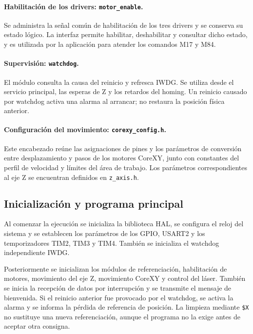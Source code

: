 \documentclass[blue,fullpaper]{ludusofficial}  %
\begin{document}
\paragraph{Habilitación de los drivers:
\texttt{motor\_enable}.}
Se administra la señal común de habilitación de los
tres drivers y se conserva su estado lógico. La interfaz
permite habilitar, deshabilitar y consultar dicho estado,
y es utilizada por la aplicación para atender los
comandos M17 y M84.

\paragraph{Supervisión: \texttt{watchdog}.}
El módulo consulta la causa del reinicio y refresca IWDG. Se utiliza desde el servicio principal, las esperas de Z y los retardos del homing. Un reinicio causado por watchdog activa una alarma al arrancar; no restaura la posición física anterior.

\paragraph{Configuración del movimiento:
\texttt{corexy\_config.h}.}
Este encabezado reúne las asignaciones de pines y
los parámetros de conversión entre desplazamiento
y pasos de los motores CoreXY, junto con constantes
del perfil de velocidad y límites del área de trabajo.
Los parámetros correspondientes al eje Z se encuentran
definidos en \texttt{z\_axis.h}.

\subsection{Inicialización y programa principal}

Al comenzar la ejecución se inicializa
la biblioteca HAL, se configura el reloj
del sistema y se establecen los parámetros
de los GPIO, USART2 y los temporizadores
TIM2, TIM3 y TIM4. También se inicializa el watchdog independiente IWDG.

Posteriormente se inicializan los módulos
de referenciación, habilitación de motores,
movimiento del eje Z, movimiento CoreXY
y control del láser. También se inicia
la recepción de datos por interrupción
y se transmite el mensaje de bienvenida. Si el reinicio anterior fue provocado por el watchdog, se activa la alarma y se informa la pérdida de referencia de posición. La limpieza mediante \texttt{\$X} no sustituye una nueva referenciación, aunque el programa no la exige antes de aceptar otra consigna.
\end{document}

